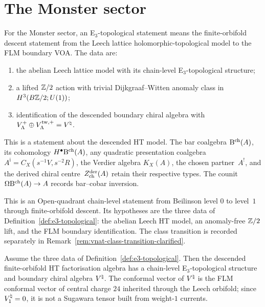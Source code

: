 \section{The Monster sector}
\label{sec:vnat-e3-topological}

\begin{definition}
\label{def:e3-topological}
For the Monster sector, an E$_3$-topological statement means the
finite-orbifold descent statement from the Leech lattice
holomorphic-topological model to the FLM boundary VOA.  The data are:
\begin{enumerate}[label=\textup{(\roman*)}]
\item the abelian Leech lattice model with its chain-level
E$_3$-topological structure;
\item a lifted $\mathbb Z/2$ action with trivial Dijkgraaf--Witten anomaly
class in $H^3(B\mathbb Z/2;U(1))$;
\item identification of the descended boundary chiral algebra with
$V_\Lambda^+\oplus V_\Lambda^{\mathrm{tw},+}=V^{\natural}$.
\end{enumerate}
This is a statement about the descended HT model.  The bar coalgebra
$\mathrm B^{\mathrm{ch}}(A)$, its cohomology $H^\bullet\mathrm B^{\mathrm{ch}}(A)$, any quadratic
presentation coalgebra $A^{\mathrm i}=C_X(s^{-1}V,s^{-2}R)$,
the Verdier algebra $K_X(A)$, the chosen partner~$A^!$, and the
derived chiral centre~$Z^{\mathrm{der}}_{\mathrm{ch}}(A)$ retain their respective types.
The counit $\Omega\mathrm B^{\mathrm{ch}}(A)\to A$ records bar--cobar inversion.
\end{definition}

\begin{theorem}
\label{thm:v-natural-e3-topological}
This is an Open-quadrant chain-level statement from Beilinson level
$0$ to level~$1$ through finite-orbifold descent. Its hypotheses are
the three data of Definition~\ref{def:e3-topological}: the abelian
Leech HT model, an anomaly-free $\mathbb Z/2$ lift, and the FLM boundary
identification. The class transition is recorded separately in
Remark~\ref{rem:vnat-class-transition-clarified}.

Assume the three data of Definition~\ref{def:e3-topological}.  Then
the descended finite-orbifold HT factorisation algebra has a
chain-level E$_3$-topological structure and boundary chiral algebra
$V^{\natural}$.  The conformal vector of $V^{\natural}$ is the FLM conformal vector
of central charge $24$ inherited through the Leech orbifold; since
$V^{\natural}_1=0$, it is not a Sugawara tensor built from weight-$1$
currents.
\end{theorem}

